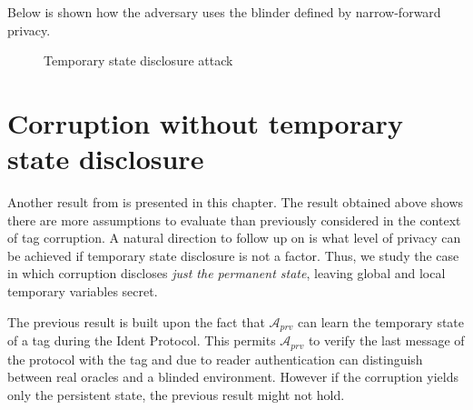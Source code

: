     Below is shown how the adversary uses the blinder defined by narrow-forward privacy.

    \begin{figure}[H]

    \hspace*{0cm}
    \caption{Temporary state disclosure attack}
    \end{figure}

\section{Corruption without temporary state disclosure}

    Another result from \cite{Impossibility_results} is presented in this chapter. 
    The result obtained above shows there are more assumptions to evaluate than
    previously considered in the context of tag corruption. A natural direction
    to follow up on is what level of privacy can be achieved if temporary state
    disclosure is not a factor. Thus, we study the case in which corruption discloses 
    \textit{just the permanent state}, leaving global and local temporary variables
    secret.

    The previous result is built upon the fact that $\mathcal{A}_{prv}$ can learn the
    temporary state of a tag during the Ident Protocol. This permits $\mathcal{A}_{prv}$
    to verify the last message of the protocol with the tag and due to reader authentication
    can distinguish between real oracles and a blinded environment. However if the corruption
    yields only the persistent state, the previous result might not hold.
    
